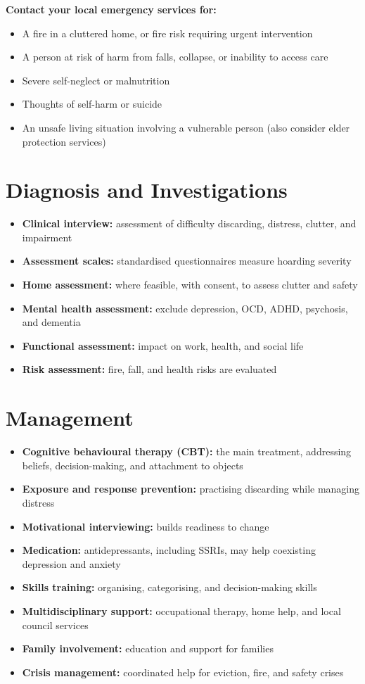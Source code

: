\textbf{Contact your local emergency services for:}
\begin{itemize}
    \item A fire in a cluttered home, or fire risk requiring urgent intervention
    \item A person at risk of harm from falls, collapse, or inability to access care
    \item Severe self-neglect or malnutrition
    \item Thoughts of self-harm or suicide
    \item An unsafe living situation involving a vulnerable person (also consider elder protection services)
\end{itemize}

\section*{Diagnosis and Investigations}
\begin{itemize}
    \item \textbf{Clinical interview:} assessment of difficulty discarding, distress, clutter, and impairment
    \item \textbf{Assessment scales:} standardised questionnaires measure hoarding severity
    \item \textbf{Home assessment:} where feasible, with consent, to assess clutter and safety
    \item \textbf{Mental health assessment:} exclude depression, OCD, ADHD, psychosis, and dementia
    \item \textbf{Functional assessment:} impact on work, health, and social life
    \item \textbf{Risk assessment:} fire, fall, and health risks are evaluated
\end{itemize}

\section*{Management}
\begin{itemize}
    \item \textbf{Cognitive behavioural therapy (CBT):} the main treatment, addressing beliefs, decision-making, and attachment to objects
    \item \textbf{Exposure and response prevention:} practising discarding while managing distress
    \item \textbf{Motivational interviewing:} builds readiness to change
    \item \textbf{Medication:} antidepressants, including SSRIs, may help coexisting depression and anxiety
    \item \textbf{Skills training:} organising, categorising, and decision-making skills
    \item \textbf{Multidisciplinary support:} occupational therapy, home help, and local council services
    \item \textbf{Family involvement:} education and support for families
    \item \textbf{Crisis management:} coordinated help for eviction, fire, and safety crises
\end{itemize}

